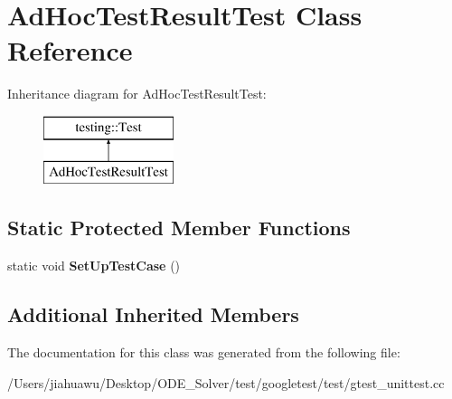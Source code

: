 \hypertarget{class_ad_hoc_test_result_test}{}\section{Ad\+Hoc\+Test\+Result\+Test Class Reference}
\label{class_ad_hoc_test_result_test}
Inheritance diagram for Ad\+Hoc\+Test\+Result\+Test\+:\begin{figure}[H]
\begin{center}
\leavevmode
\includegraphics[height=2.000000cm]{class_ad_hoc_test_result_test}
\end{center}
\end{figure}
\subsection*{Static Protected Member Functions}
\begin{DoxyCompactItemize}
\item 
\mbox{\label{class_ad_hoc_test_result_test_a0955d04d3dd7994561930c83489914a3}} 
static void {\bfseries Set\+Up\+Test\+Case} ()
\end{DoxyCompactItemize}
\subsection*{Additional Inherited Members}


The documentation for this class was generated from the following file\+:\begin{DoxyCompactItemize}
\item 
/\+Users/jiahuawu/\+Desktop/\+O\+D\+E\+\_\+\+Solver/test/googletest/test/gtest\+\_\+unittest.\+cc\end{DoxyCompactItemize}
